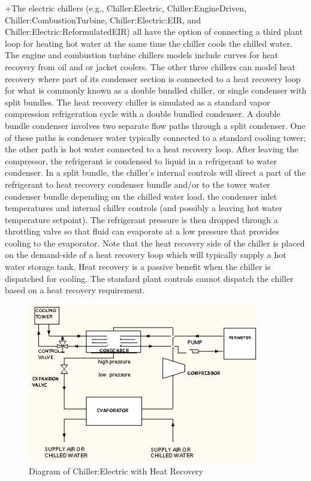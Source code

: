 +The electric chillers (e.g., Chiller:Electric, Chiller:EngineDriven, Chiller:CombustionTurbine, Chiller:Electric:EIR, and Chiller:Electric:ReformulatedEIR) all have the option of connecting a third plant loop for heating hot water at the same time the chiller cools the chilled water. The engine and combustion turbine chillers models include curves for heat recovery from oil and or jacket coolers. The other three chillers can model heat recovery where part of its condenser section is connected to a heat recovery loop for what is commonly known as a double bundled chiller, or single condenser with split bundles. The heat recovery chiller is simulated as a standard vapor compression refrigeration cycle with a double bundled condenser. A double bundle condenser involves two separate flow paths through a split condenser. One of these paths is condenser water typically connected to a standard cooling tower; the other path is hot water connected to a heat recovery loop. After leaving the compressor, the refrigerant is condensed to liquid in a refrigerant to water condenser. In a split bundle, the chiller's internal controls will direct a part of the refrigerant to heat recovery condenser bundle and/or to the tower water condenser bundle depending on the chilled water load, the condenser inlet temperatures and internal chiller controls (and possibly a leaving hot water temperature setpoint). The refrigerant pressure is then dropped through a throttling valve so that fluid can evaporate at a low pressure that provides cooling to the evaporator. Note that the heat recovery side of the chiller is placed on the demand-side of a heat recovery loop which will typically supply a hot water storage tank. Heat recovery is a passive benefit when the chiller is dispatched for cooling. The standard plant controls cannot dispatch the chiller based on a heat recovery requirement.

\begin{figure}[hbtp] %
\centering
\includegraphics[width=0.9\textwidth, height=0.9\textheight, keepaspectratio=true]{media/image3175.png}
\caption{  Diagram of Chiller:Electric with Heat Recovery \protect \label{fig:diagram-of-chiller-electric-with-heat}}
\end{figure}

